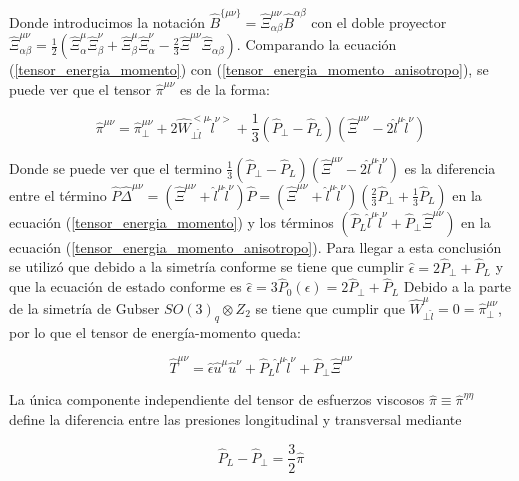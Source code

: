 \documentclass[11pt,a4paper]{article}
\begin{document}
Donde introducimos la notación $\hat{B}^{{{\{}\mu}{\nu{\}}}}=\hat{\Xi}^{{\mu}{\nu}}_{{\alpha}{\beta}}\hat{B}^{{\alpha}{\beta}}$ con el doble proyector $\hat{\Xi}^{{\mu}{\nu}}_{{\alpha}{\beta}}=\frac{1}{2}(\hat{\Xi}^{\mu}_{\alpha}\hat{\Xi}^{\nu}_{\beta}+\hat{\Xi}^{\mu}_{\beta}\hat{\Xi}^{\nu}_{\alpha}-\frac{2}{3}\hat{\Xi}^{{\mu}{\nu}}\hat{\Xi}_{{\alpha}{\beta}})$.
Comparando la ecuación (\ref{tensor_energia_momento}) con (\ref{tensor_energia_momento_anisotropo}), se puede ver que el tensor $\hat{\pi}^{{\mu}{\nu}}$ es de la forma:

\begin{equation}
\hat{\pi}^{{\mu}{\nu}}= 
\hat{\pi}^{{\mu}{\nu}}_{\bot}
+2\hat{W}_{{\bot}{\hat{l}}}^{<{\mu}}{{\hat{l}^{\nu>}}}
+\frac{1}{3}(\hat{P}_{\bot}-\hat{P}_{L})(\hat{\Xi}^{{\mu}{\nu}}-2\hat{l}^{\mu}\hat{l}^{\nu})
\label{shear_anisotropo_descomposicion}
 \end{equation}

Donde se puede ver que el termino $\frac{1}{3}(\hat{P}_{\bot}-\hat{P}_{L})(\hat{\Xi}^{{\mu}{\nu}}-2\hat{l}^{\mu}\hat{l}^{\nu})$ es la diferencia entre el término $\hat{P}\hat{\Delta}^{{\mu}{\nu}}=(\hat{\Xi}^{{\mu}{\nu}}+\hat{l}^{\mu}\hat{l}^{\nu})\hat{P}=(\hat{\Xi}^{{\mu}{\nu}}+\hat{l}^{\mu}\hat{l}^{\nu})(\frac{2}{3}\hat{P}_{\bot}+\frac{1}{3}\hat{P}_{L})$ en la ecuación (\ref{tensor_energia_momento}) y los términos $(\hat{P}_{L}\hat{l}^{\mu}\hat{l}^{\nu}+\hat{P}_{\bot}\hat{\Xi}^{{\mu}{\nu}})$ en la ecuación (\ref{tensor_energia_momento_anisotropo}). Para llegar a esta conclusión se utilizó que debido a la simetría conforme se tiene que cumplir $\hat{\epsilon}=2\hat{P}_{\bot}+\hat{P}_{L}$ y que la ecuación de estado conforme es $\hat{\epsilon}=3\hat{P}_{0}(\epsilon)=2\hat{P}_{\bot}+\hat{P}_{L}$
Debido a la parte de la simetría de Gubser $SO(3)_{q}{\otimes}Z_{2}$ se tiene que cumplir que $\hat{W}_{{\bot}{\hat{l}}}^{{\mu}}=0=\hat{\pi}^{{\mu}{\nu}}_{\bot}$, por lo que el tensor de energía-momento queda:

 \begin{equation}
\hat{T}^{{\mu}{\nu}}= 
\hat{\epsilon}\hat{u}^{\mu}\hat{u}^{\nu}
+\hat{P}_{L}\hat{l}^{\mu}\hat{l}^{\nu}
+\hat{P}_{\bot}\hat{\Xi}^{{\mu}{\nu}}
\label{tensor_e_m_gubser_anisotropo}
 \end{equation}
 
 La única componente independiente del tensor de esfuerzos viscosos $\hat{\pi}\equiv\hat{\pi}^{{\eta}{\eta}}$ define la diferencia entre las presiones longitudinal y transversal mediante
 
 \begin{equation}
\hat{P}_{L}-\hat{P}_{\bot}=
\frac{3}{2}\hat{\pi}
\label{diferenca_presiones}
 \end{equation} 
 
\end{document}
